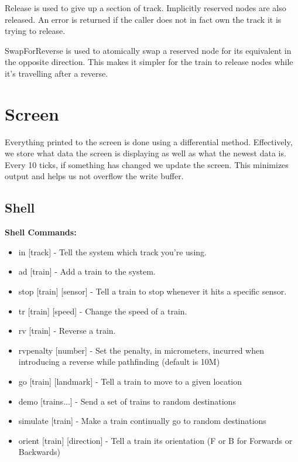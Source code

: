 \documentclass{article}
\begin{document}
Release is used to give up a section of track. Implicitly reserved nodes are also released. An error is returned if the caller does not in fact own the track it is trying to release.

SwapForReverse is used to atomically swap a reserved node for its equivalent in the opposite direction. This makes it simpler for the train to release nodes while it's travelling after a reverse.

\section{Screen}

Everything printed to the screen is done using a differential method. Effectively, we store what data the screen is displaying as well as what the newest data is. Every 10 ticks, if something has changed we update the screen. This minimizes output and helps us not overflow the write buffer.

\subsection{Shell}

\textbf{Shell Commands:}
\begin{itemize}
    \item in [track] - Tell the system which track you're using.
    \item ad [train] - Add a train to the system.
    \item stop [train] [sensor] - Tell a train to stop whenever it hits a specific sensor.
    \item tr [train] [speed] - Change the speed of a train.
    \item rv [train] - Reverse a train.
    \item rvpenalty [number] - Set the penalty, in micrometers, incurred when introducing a reverse while pathfinding (default is 10M)
    \item go [train] [landmark] - Tell a train to move to a given location
    \item demo [trains...] - Send a set of trains to random destinations
    \item simulate [train] - Make a train continually go to random destinations
    \item orient [train] [direction] - Tell a train its orientation (F or B for Forwards or Backwards)
\end{itemize}
\end{document}
